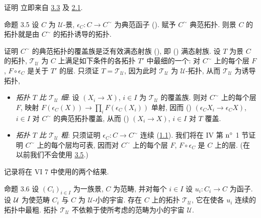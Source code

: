 \begin{enonce*}[remark]{证明}
立即来自 \hyperref[III.cor3.3]{3.3} 及 \hyperref[III.def2.1]{2.1}.
\end{enonce*}

\begin{enonce*}{命题 3.5}
设\pageoriginale{} $C$ 为 $𝒰$-景, $\epsilon_C:C\rightarrow C^{\sim}$ 为典范函子
{\rm ()}.
赋予 $C^{\sim}$ 典范拓扑. 则景 $C$ 的拓扑就是由 $C^{\sim}$ 的拓扑诱导的拓扑.
\end{enonce*}

\begin{enonce*}[remark]{证明}
$C^{\sim}$ 的典范拓扑的覆盖族是泛有效满态射族
(), 即 () 满态射族.
设 $T$ 为景 $C$ 的拓扑, $𝒯_{𝒰}$ 为 $C$ 上满足如下条件的各拓扑 $T'$ 中最细的一个:
对 $C^{\sim}$ 上的每个层 $F$, $F\circ\epsilon_C$ 是关于 $T'$ 的层.
只须证 $T=𝒯_{𝒰}$, 因为此时 $𝒯_{𝒰}$ 为 $𝒰$-拓扑, 从而 $𝒯_{𝒰}$ 为诱导拓扑,
\begin{itemize}
\item[A)] \emph{拓扑 $T$ 比 $𝒯_{𝒰}$ 细}:
设 $(X_i\rightarrow X)$, $i\in I$ 为 $𝒯_{𝒰}$ 的覆盖族.
则对 $C^{\sim}$ 上的每个层 $F$, 映射
$F(\epsilon_C(X))\rightarrow\prod_i F(\epsilon_C(X_i))$ 单射,
因而 ()
$(\epsilon_C X_i\rightarrow \epsilon_CX)$, $i\in I$
对 $C^{\sim}$ 的典范拓扑覆盖, 从而
() $(X_i\rightarrow X)$, $i\in I$ 对 $T$ 覆盖.

\item[B)] \emph{拓扑 $T$ 比 $𝒯_{𝒰}$ 粗}:
只须证明 $\epsilon_C:C\rightarrow C^{\sim}$ 连续 (\hyperref[III.def1.1]{1.1}).
我们将在 IV 第 ${\rm n^{\circ}}$ 1 节证明 $C^{\sim}$ 上的每个层均可表,
因而对 $C^{\sim}$ 上的每个层 $F$, $F\circ\epsilon_C$ 是 $C$ 上的层.
(在  以前我们不会使用 \hyperref[III.prop3.5]{3.5}.)
\end{itemize}
记录将在 VI 7 中使用的两个结果.
\end{enonce*}

\begin{enonce*}{命题 3.6}
设 $(C_i)_{i\in I}$ 为一族景, $C$ 为范畴,
并对每个 $i\in I$ 设 $u_i:C_i\rightarrow C$ 为函子.
设 $\protect\mathcal{{\mathcal U}}$ 为使范畴 $C_i$ 与 $C$ 为 $𝒰$-小的宇宙.
存在 $C$ 上的拓扑 $𝒯_{𝒰}$, 它在使各 $u_i$ 连续的拓扑中最粗.
拓扑 $𝒯_{𝒰}$ 不依赖于使所考虑的范畴为小的宇宙 $𝒰$.
\end{enonce*}

